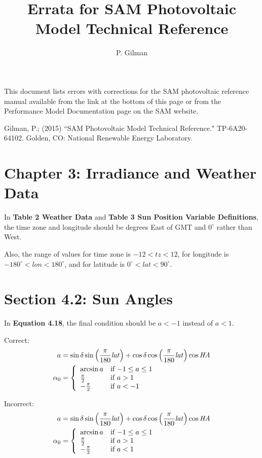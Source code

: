 \documentclass[report]{nrel}
\title{Errata for SAM Photovoltaic Model Technical Reference}
\author{P. Gilman}
\begin{document}
This document lists errors with corrections for the SAM photovoltaic reference manual available from the link at the bottom of this page or from the Performance Model Documentation page on the SAM website.

Gilman, P.; (2015) ``SAM Photovoltaic Model Technical Reference." TP-6A20-64102. Golden, CO: National Renewable Energy Laboratory.



\section*{Chapter 3: Irradiance and Weather Data}

In \textbf{Table 2 Weather Data} and \textbf{Table 3 Sun Position Variable Definitions}, the time zone and longitude should be degrees East of GMT and $0^\circ$ rather than West.

Also, the range of values for time zone is $-12 < \mathit{tz} < 12$, for longitude is $-180^\circ < \mathit{lon} < 180^\circ$, and for latitude is $ 0^\circ < \mathit{lat} < 90^\circ$.

\section*{Section 4.2: Sun Angles}

In \textbf{Equation 4.18}, the final condition should be $a<-1$ instead of $a<1$.

Correct:
\begin{align*}
a &= \sin\delta \sin\left(\frac{\pi}{180}\mathit{lat}\right) + \cos\delta \cos\left(\frac{\pi}{180}\mathit{lat}\right) \cos\mathit{HA}\notag\\
\alpha_0 &=\left\{
  \begin{array}{ll}
    \arcsin a & \text{if $-1 \leq a \leq 1$}\\
    \frac{\pi}{2} & \text{if $a>1$}\\
    -\frac{\pi}{2} & \text{if $a<-1$}
  \end{array}
\right.
\end{align*}

Incorrect:
\begin{align*}
a &= \sin\delta \sin\left(\frac{\pi}{180}\mathit{lat}\right) + \cos\delta \cos\left(\frac{\pi}{180}\mathit{lat}\right) \cos\mathit{HA}\notag\\
\alpha_0 &=\left\{
  \begin{array}{ll}
    \arcsin a & \text{if $-1 \leq a \leq 1$}\\
    \frac{\pi}{2} & \text{if $a>1$}\\
    -\frac{\pi}{2} & \text{if $a<1$}
  \end{array}
\right.
\end{align*}
\end{document}
